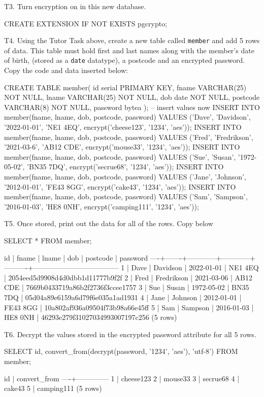 T3. Turn encryption on in this new database.
\begin{sql}
CREATE EXTENSION IF NOT EXISTS pgcrypto;
\end{sql}

T4. Using the Tutor Task above, create a new table called \verb|member| and add 5 rows of data. This table must hold first and last names along with the member's date of birth, (stored as a \verb|date| datatype), a postcode and an encrypted password. Copy the code and data inserted below:
\begin{sql}
CREATE TABLE member(
    id serial PRIMARY KEY,
    fname VARCHAR(25) NOT NULL,
    lname VARCHAR(25) NOT NULL,
    dob date NOT NULL,
    postcode VARCHAR(8) NOT NULL,
    password bytea
);
-- insert values now
INSERT INTO member(fname, lname, dob, postcode, password) VALUES ('Dave', 'Davidson', '2022-01-01', 'NE1 4EQ', encrypt('cheese123', '1234', 'aes'));
INSERT INTO member(fname, lname, dob, postcode, password) VALUES ('Fred', 'Fredrikson', '2021-03-6', 'AB12 CDE', encrypt('mouse33', '1234', 'aes'));
INSERT INTO member(fname, lname, dob, postcode, password) VALUES ('Sue', 'Susan', '1972-05-02', 'BN35 7DQ', encrypt('secrue68', '1234', 'aes'));
INSERT INTO member(fname, lname, dob, postcode, password) VALUES ('Jane', 'Johnson', '2012-01-01', 'FE43 8GG', encrypt('cake43', '1234', 'aes'));
INSERT INTO member(fname, lname, dob, postcode, password) VALUES ('Sam', 'Sampson', '2016-01-03', 'HE8 0NH', encrypt('camping111', '1234', 'aes'));
\end{sql}

T5. Once stored, print out the data for all of the rows. Copy below
\begin{sql}
SELECT * FROM member;
\end{sql}
\begin{pseudo}
 id | fname |   lname    |    dob     | postcode |              password
----+-------+------------+------------+----------+------------------------------------
  1 | Dave  | Davidson   | 2022-01-01 | NE1 4EQ  | \x2054eed5d9908d4d0dbb1d11777b9f2f
  2 | Fred  | Fredrikson | 2021-03-06 | AB12 CDE | \x7669b0433719a86b2f2736f3ccee1757
  3 | Sue   | Susan      | 1972-05-02 | BN35 7DQ | \x05d04a89e6159a6d79f6e035a1ad1931
  4 | Jane  | Johnson    | 2012-01-01 | FE43 8GG | \xb10a802af936a09504f73b98a66e45ff
  5 | Sam   | Sampson    | 2016-01-03 | HE8 0NH  | \xa46293e279f31027034993007197c256
(5 rows)
\end{pseudo}

T6. Decrypt the values stored in the encrypted password attribute for all 5 rows. 
\begin{sql}
SELECT id, convert_from(decrypt(password, '1234', 'aes'), 'utf-8') FROM member;
\end{sql}
\begin{pseudo}
 id | convert_from
----+--------------
  1 | cheese123
  2 | mouse33
  3 | secrue68
  4 | cake43
  5 | camping111
(5 rows)
\end{pseudo}

